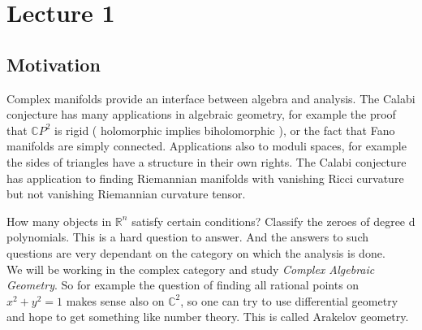 % 
\section{Lecture 1} %

\subsection{Motivation} %
\label{ssub:the_endgame}

Complex manifolds provide an interface between algebra and analysis.
The Calabi conjecture has many applications in algebraic geometry, for example the proof that $\mathbb{C}P^2$ is rigid ( holomorphic implies biholomorphic ), or the fact that Fano manifolds are simply connected.
Applications also to moduli spaces, for example the sides of triangles have a structure in their own rights.
The Calabi conjecture has application to finding Riemannian manifolds with vanishing Ricci curvature but not vanishing Riemannian curvature tensor.

How many objects in $\mathbb{R}^n$ satisfy certain conditions? Classify the zeroes of degree d polynomials. This is a hard question to answer. And the answers to such questions are very dependant on the category on which the analysis is done. \\
We will be working in the complex category and study \textit{Complex Algebraic Geometry}.
So for example the question of finding all rational points on $x^2 + y^{2} = 1$ makes sense also on $\mathbb{C}^2$, so one can try to use differential geometry and hope to get something like number theory. This is called Arakelov geometry.
% 
% 
